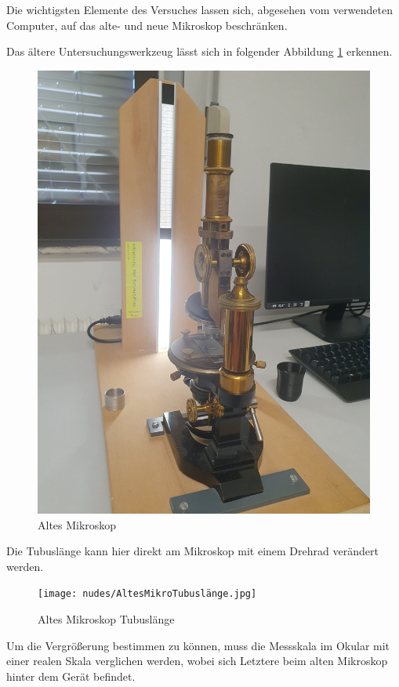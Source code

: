 \documentclass[12pt,a4paper,twoside]{article}
\begin{document}
    Die wichtigsten Elemente des Versuches lassen sich, abgesehen vom verwendeten Computer, auf das alte- und neue Mikroskop beschränken. \newline
    
    Das ältere Untersuchungswerkzeug lässt sich in folgender Abbildung \ref{fig:Altes Mikroskop} erkennen.  

    \begin{figure}[H]
        \centering
        \includegraphics[width=0.5\linewidth, angle=-90]{nudes/AltesMikro.jpg}
        \caption{Altes Mikroskop}
        \label{fig:Altes Mikroskop}
    \end{figure}

    \noindent
    Die Tubuslänge kann hier direkt am Mikroskop mit einem Drehrad verändert werden.
    
    \begin{figure}[H]
        \centering
        \texttt{[image: nudes/AltesMikroTubuslänge.jpg]}
        \caption{Altes Mikroskop Tubuslänge}
        \label{fig:Altes Mikroskop Tubuslänge}
    \end{figure}

    \noindent
    Um die Vergrößerung bestimmen zu können, muss die Messskala im Okular mit einer realen Skala verglichen werden, wobei sich Letztere beim alten Mikroskop hinter dem Gerät befindet.
\end{document}
